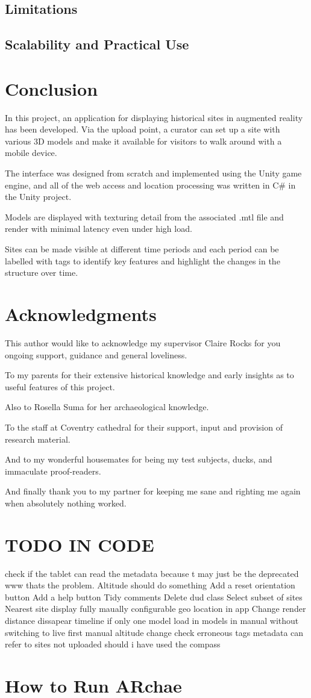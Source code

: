 \documentclass{article}
\begin{document}
\subsection{Limitations}
\subsection{Scalability and Practical Use}

\section{Conclusion}
In this project, an application for displaying historical sites in augmented reality has been developed. Via the upload point, a curator can set up a site with various 3D models and make it available for visitors to walk around with a mobile device. 

The interface was designed from scratch and implemented using the Unity game engine, and all of the web access and location processing was written in C\# in the Unity project. 

Models are displayed with texturing detail from the associated .mtl file and render with minimal latency even under high load. 

Sites can be made visible at different time periods and each period can be labelled with tags to identify key features and highlight the changes in the structure over time.


\section{Acknowledgments}
This author would like to acknowledge my supervisor Claire Rocks for you ongoing support, guidance and general loveliness.

To my parents for their extensive historical knowledge and early insights as to useful features of this project.

Also to Rosella Suma for her archaeological knowledge.

To the staff at Coventry cathedral for their support, input and provision of research material.

And to my wonderful housemates for being my test subjects, ducks, and immaculate proof-readers.

And finally thank you to my partner for keeping me sane and righting me again when absolutely nothing worked. 

\section{TODO IN CODE}
check if the tablet can read the metadata because t may just be the deprecated www thats the problem.
Altitude should do something
Add a reset orientation button
Add a help button
Tidy comments
Delete dud class 
Select subset of sites
Nearest site display
fully maually configurable geo location in app
Change render distance
dissapear timeline if only one model
load in models in manual without switching to live first
manual altitude change
check erroneous tags
metadata can refer to sites not uploaded
should i have used the compass 



\appendix

\section{How to Run ARchae}
\end{document}

